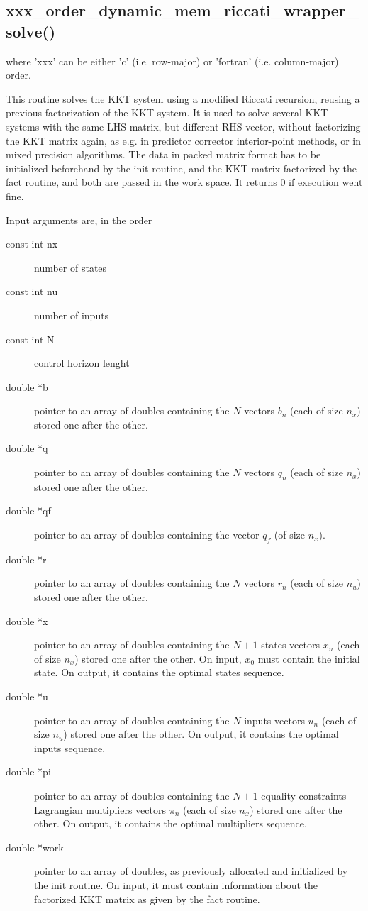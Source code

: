 \documentclass[a4paper]{report}
\begin{document}
\subsection{xxx\_order\_dynamic\_mem\_riccati\_wrapper\_solve() } 
where 'xxx' can be either 'c' (i.e. row-major) or 'fortran' (i.e. column-major) order.

This routine solves the KKT system using a modified Riccati recursion, reusing a previous factorization of the KKT system.
It is used to solve several KKT systems with the same LHS matrix, but different RHS vector, without factorizing the KKT matrix again, as e.g. in predictor corrector interior-point methods, or in mixed precision algorithms.
The data in packed matrix format has to be initialized beforehand by the init routine, and the KKT matrix factorized by the fact routine, and both are passed in the work space.
It returns 0 if execution went fine.

Input arguments are, in the order
\begin{description}
\item[const int nx] number of states
\item[const int nu] number of inputs
\item[const int N] control horizon lenght
\item[double *b] pointer to an array of doubles containing the $N$ vectors $b_n$ (each of size $n_x$) stored one after the other.
\item[double *q] pointer to an array of doubles containing the $N$ vectors $q_n$ (each of size $n_x$) stored one after the other.
\item[double *qf] pointer to an array of doubles containing the vector $q_f$ (of size $n_x$).
\item[double *r] pointer to an array of doubles containing the $N$ vectors $r_n$ (each of size $n_u$) stored one after the other.
\item[double *x] pointer to an array of doubles containing the $N+1$ states vectors $x_n$ (each of size $n_x$) stored one after the other. On input, $x_0$ must contain the initial state. On output, it contains the optimal states sequence.
\item[double *u] pointer to an array of doubles containing the $N$ inputs vectors $u_n$ (each of size $n_u$) stored one after the other. On output, it contains the optimal inputs sequence.
\item[double *pi] pointer to an array of doubles containing the $N+1$ equality constraints Lagrangian multipliers vectors $\pi_n$ (each of size $n_x$) stored one after the other. On output, it contains the optimal multipliers sequence.
\item[double *work] pointer to an array of doubles, as previously allocated and initialized by the init routine. On input, it must contain information about the factorized KKT matrix as given by the fact routine.
\end{description}
\end{document}
